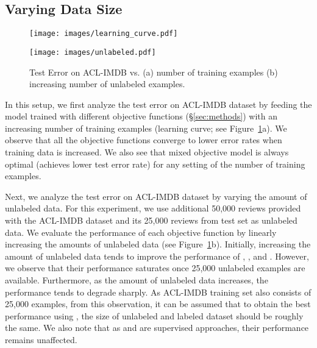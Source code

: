 \documentclass[letterpaper]{article}
\begin{document}
\subsection{Varying Data Size}
\begin{figure}[!htp]
\begin{minipage}{0.5\linewidth}
\centering
\texttt{[image: images/learning\_curve.pdf]}
\end{minipage}\begin{minipage}{0.5\linewidth}
\centering
\texttt{[image: images/unlabeled.pdf]}
\end{minipage}
\caption{Test Error on ACL-IMDB vs. (a) number of training examples (b) increasing number of unlabeled examples.}
\label{fig:varying_data}
\end{figure}

In this setup, we first analyze the test error on ACL-IMDB dataset by feeding the model trained with different objective functions (\S\ref{sec:methods}) with an increasing number of training examples (learning curve; see Figure~\ref{fig:varying_data}a). We observe that all the objective functions converge to lower error rates when training data is increased. We also see that mixed objective model is always optimal (achieves lower test error rate) for any setting of the number of training examples.

Next, we analyze the test error on ACL-IMDB dataset by varying the amount of unlabeled data. For this experiment, we use additional 50,000 reviews provided with the ACL-IMDB dataset and its 25,000 reviews from test set as unlabeled data. We evaluate the performance of each objective function by linearly increasing the amounts of unlabeled data (see Figure~\ref{fig:varying_data}b). Initially, increasing the amount of unlabeled data tends to improve the performance of , , and . However, we observe that their performance saturates once 25,000 unlabeled examples are available. Furthermore, as the amount of unlabeled data increases, the performance tends to degrade sharply. As ACL-IMDB training set also consists of 25,000 examples, from this observation, it can be assumed that to obtain the best performance using , the size of unlabeled and labeled dataset should be roughly the same. We also note that as  and  are supervised approaches, their performance remains unaffected.
\end{document}
